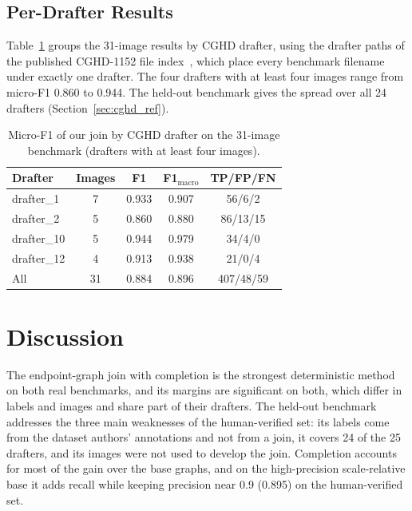 \documentclass{ieeeaccess}
\begin{document}
\subsection{Per-Drafter Results}

Table~\ref{tab:per_drafter} groups the 31-image results by CGHD drafter, using the drafter paths of the published CGHD-1152 file index~\cite{cghd1152data}, which place every benchmark filename under exactly one drafter. The four drafters with at least four images range from micro-F1 0.860 to 0.944. The held-out benchmark gives the spread over all 24 drafters (Section~\ref{sec:cghd_ref}).

\begin{table}[t]
\caption{Micro-F1 of our join by CGHD drafter on the 31-image benchmark (drafters with at least four images).}
\label{tab:per_drafter}
\centering
\footnotesize
\begin{tabular}{lcccc}
\toprule
\textbf{Drafter} & \textbf{Images} & \textbf{F1} & \textbf{F1$_{\text{macro}}$} & \textbf{TP/FP/FN} \\
\midrule
drafter\_1  & 7 & 0.933 & 0.907 & 56/6/2 \\
drafter\_2  & 5 & 0.860 & 0.880 & 86/13/15 \\
drafter\_10 & 5 & 0.944 & 0.979 & 34/4/0 \\
drafter\_12 & 4 & 0.913 & 0.938 & 21/0/4 \\
\midrule
All         & 31 & 0.884 & 0.896 & 407/48/59 \\
\bottomrule
\end{tabular}
\end{table}

\section{Discussion}
\label{sec:discussion}

The endpoint-graph join with completion is the strongest deterministic method on both real benchmarks, and its margins are significant on both, which differ in labels and images and share part of their drafters. The held-out benchmark addresses the three main weaknesses of the human-verified set: its labels come from the dataset authors' annotations and not from a join, it covers 24 of the 25 drafters, and its images were not used to develop the join. Completion accounts for most of the gain over the base graphs, and on the high-precision scale-relative base it adds recall while keeping precision near 0.9 (0.895) on the human-verified set.
\end{document}
